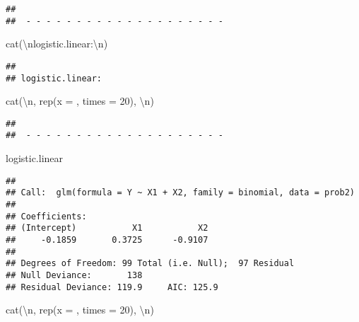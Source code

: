 \documentclass[
]{article}
\newenvironment{Shaded}{\begin{snugshade}}{\end{snugshade}}
\newcommand{\AttributeTok}[1]{\textcolor[rgb]{0.77,0.63,0.00}{#1}}
\newcommand{\DecValTok}[1]{\textcolor[rgb]{0.00,0.00,0.81}{#1}}
\newcommand{\FunctionTok}[1]{\textcolor[rgb]{0.00,0.00,0.00}{#1}}
\newcommand{\NormalTok}[1]{#1}
\newcommand{\SpecialCharTok}[1]{\textcolor[rgb]{0.00,0.00,0.00}{#1}}
\newcommand{\StringTok}[1]{\textcolor[rgb]{0.31,0.60,0.02}{#1}}
\begin{document}
\begin{verbatim}
## 
##  - - - - - - - - - - - - - - - - - - - -
\end{verbatim}

\begin{Shaded}
\begin{Highlighting}[]
\FunctionTok{cat}\NormalTok{(}\StringTok{\textquotesingle{}}\SpecialCharTok{\textbackslash{}n}\StringTok{logistic.linear:}\SpecialCharTok{\textbackslash{}n}\StringTok{\textquotesingle{}}\NormalTok{)}
\end{Highlighting}
\end{Shaded}

\begin{verbatim}
## 
## logistic.linear:
\end{verbatim}

\begin{Shaded}
\begin{Highlighting}[]
\FunctionTok{cat}\NormalTok{(}\StringTok{\textquotesingle{}}\SpecialCharTok{\textbackslash{}n}\StringTok{\textquotesingle{}}\NormalTok{, }\FunctionTok{rep}\NormalTok{(}\AttributeTok{x =} \StringTok{\textquotesingle{}{-}\textquotesingle{}}\NormalTok{, }\AttributeTok{times =} \DecValTok{20}\NormalTok{), }\StringTok{\textquotesingle{}}\SpecialCharTok{\textbackslash{}n}\StringTok{\textquotesingle{}}\NormalTok{)}
\end{Highlighting}
\end{Shaded}

\begin{verbatim}
## 
##  - - - - - - - - - - - - - - - - - - - -
\end{verbatim}

\begin{Shaded}
\begin{Highlighting}[]
\NormalTok{logistic.linear}
\end{Highlighting}
\end{Shaded}

\begin{verbatim}
## 
## Call:  glm(formula = Y ~ X1 + X2, family = binomial, data = prob2)
## 
## Coefficients:
## (Intercept)           X1           X2  
##     -0.1859       0.3725      -0.9107  
## 
## Degrees of Freedom: 99 Total (i.e. Null);  97 Residual
## Null Deviance:       138 
## Residual Deviance: 119.9     AIC: 125.9
\end{verbatim}

\begin{Shaded}
\begin{Highlighting}[]
\FunctionTok{cat}\NormalTok{(}\StringTok{\textquotesingle{}}\SpecialCharTok{\textbackslash{}n}\StringTok{\textquotesingle{}}\NormalTok{, }\FunctionTok{rep}\NormalTok{(}\AttributeTok{x =} \StringTok{\textquotesingle{}{-}\textquotesingle{}}\NormalTok{, }\AttributeTok{times =} \DecValTok{20}\NormalTok{), }\StringTok{\textquotesingle{}}\SpecialCharTok{\textbackslash{}n}\StringTok{\textquotesingle{}}\NormalTok{)}
\end{Highlighting}
\end{Shaded}
\end{document}
